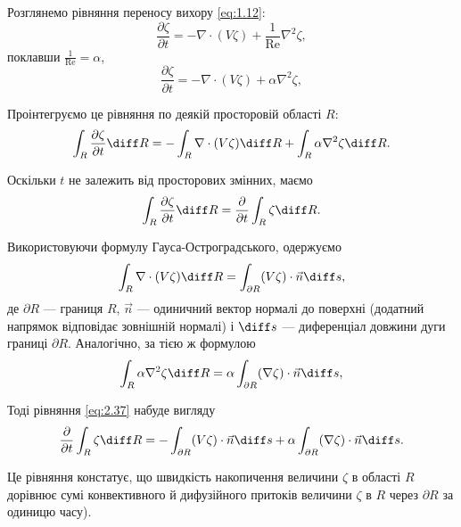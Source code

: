 Розглянемо рівняння переносу вихору \eqref{eq:1.12}:
\begin{equation*}
    \frac{\partial \zeta}{\partial t} = - \nabla \cdot (V \zeta) + \frac{1}{\text{Re}} \nabla^2 \zeta,
\end{equation*}
поклавши $\frac{1}{\text{Re}} = \alpha$,
\begin{equation}
    \label{eq:2.36}
    \frac{\partial \zeta}{\partial t} = - \nabla \cdot (V \zeta) + \alpha \nabla^2 \zeta,
\end{equation}

Проінтегруємо це рівняння по деякій просторовій області $R$:
\begin{equation}
    \label{eq:2.37}
    \int_R \frac{\partial \zeta}{\partial t} \diff R = - \int_R \nabla \cdot (V \zeta) \diff R + \int_R \alpha \nabla^2 \zeta \diff R.
\end{equation}

Оскільки $t$ не залежить від просторових змінних, маємо
\begin{equation}
    \label{eq:2.38}
    \int_R \frac{\partial \zeta}{\partial t} \diff R = \frac{\partial}{\partial t} \int_R \zeta \diff R.
\end{equation}

Використовуючи формулу Гауса-Остроградського, одержуємо
\begin{equation}
    \label{eq:2.39}
    \int_R \nabla \cdot (V \zeta) \diff R = \int_{\partial R} (V \zeta) \cdot \vec n \diff s,
\end{equation}
де $\partial R$ --- границя $R$, $\vec n$ --- одиничний вектор нормалі до поверхні (додатний напрямок відповідає зовнішній нормалі) і $\diff s$ --- диференціал довжини дуги границі $\partial R$. Аналогічно, за тією ж формулою
\begin{equation}
    \label{eq:2.40}
    \int_R \alpha \nabla^2 \zeta \diff R = \alpha \int_{\partial R} (\nabla \zeta) \cdot \vec n \diff s,
\end{equation}

Тоді рівняння \eqref{eq:2.37} набуде вигляду
\begin{equation}
    \label{eq:2.41}
    \frac{\partial}{\partial t} \int_R \zeta \diff R = - \int_{\partial R} (V \zeta) \cdot \vec n \diff s + \alpha \int_{\partial R} (\nabla \zeta) \cdot \vec n \diff s.
\end{equation}

Це рівняння констатує, що швидкість накопичення величини $\zeta$ в області $R$ дорівнює сумі конвективного й дифузійного притоків величини $\zeta$ в $R$ через $\partial R$ за одиницю часу). 

